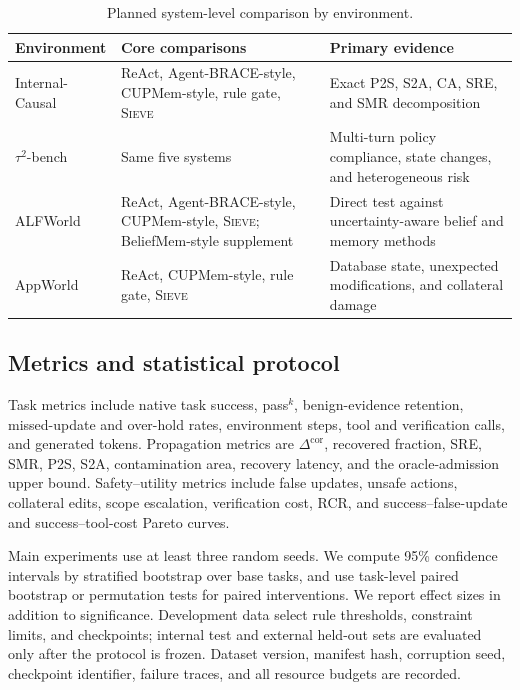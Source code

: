 \documentclass{article}
\newcommand{\method}{\textsc{Sieve}}
\begin{document}
\begin{table}[t]
\centering
\small
\caption{Planned system-level comparison by environment.}
\label{tab:benchmark-plan}
\begin{tabularx}{\textwidth}{@{}lXX@{}}
\toprule
Environment & Core comparisons & Primary evidence \\
\midrule
Internal-Causal & ReAct, Agent-BRACE-style, CUPMem-style, rule gate, \method & Exact P2S, S2A, CA, SRE, and SMR decomposition \\
$\tau^2$-bench & Same five systems & Multi-turn policy compliance, state changes, and heterogeneous risk \\
ALFWorld & ReAct, Agent-BRACE-style, CUPMem-style, \method; BeliefMem-style supplement & Direct test against uncertainty-aware belief and memory methods \\
AppWorld & ReAct, CUPMem-style, rule gate, \method & Database state, unexpected modifications, and collateral damage \\
\bottomrule
\end{tabularx}
\end{table}

\subsection{Metrics and statistical protocol}

Task metrics include native task success, pass$^k$, benign-evidence retention, missed-update and over-hold rates, environment steps, tool and verification calls, and generated tokens. Propagation metrics are $\Delta^{\mathrm{cor}}$, recovered fraction, SRE, SMR, P2S, S2A, contamination area, recovery latency, and the oracle-admission upper bound. Safety--utility metrics include false updates, unsafe actions, collateral edits, scope escalation, verification cost, RCR, and success--false-update and success--tool-cost Pareto curves.

Main experiments use at least three random seeds. We compute 95\% confidence intervals by stratified bootstrap over base tasks, and use task-level paired bootstrap or permutation tests for paired interventions. We report effect sizes in addition to significance. Development data select rule thresholds, constraint limits, and checkpoints; internal test and external held-out sets are evaluated only after the protocol is frozen. Dataset version, manifest hash, corruption seed, checkpoint identifier, failure traces, and all resource budgets are recorded.
\end{document}
